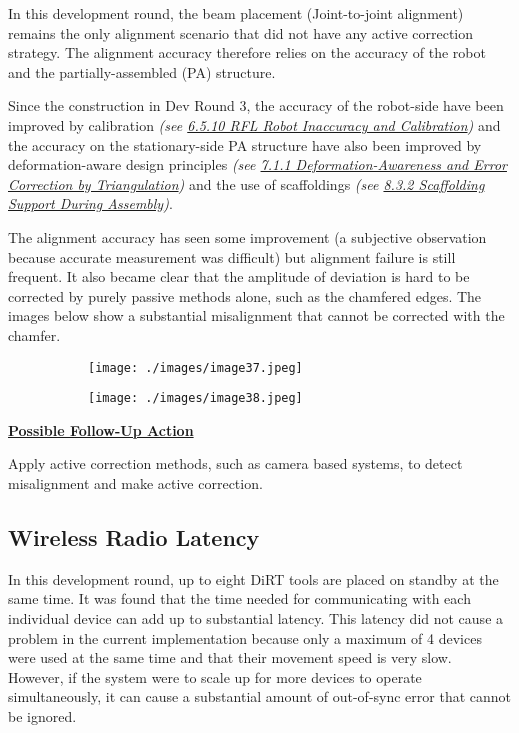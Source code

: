 In this development round, the beam placement (Joint-to-joint alignment) remains the only alignment scenario that did not have any active correction strategy. The alignment accuracy therefore relies on the accuracy of the robot and the partially-assembled (PA) structure. 

Since the construction in Dev Round 3, the accuracy of the robot-side have been improved by calibration \textit{(see \uline{6.5.10 RFL Robot Inaccuracy and Calibration})} and the accuracy on the stationary-side PA structure have also been improved by deformation-aware design principles \textit{(see \uline{7.1.1 Deformation-Awareness and Error Correction by Triangulation})} and the use of scaffoldings \textit{(see \uline{8.3.2 Scaffolding Support During Assembly})}.

The alignment accuracy has seen some improvement (a subjective observation because accurate measurement was difficult) but alignment failure is still frequent. It also became clear that the amplitude of deviation is hard to be corrected by purely passive methods alone, such as the chamfered edges. The images below show a substantial misalignment that cannot be corrected with the chamfer. 

\begin{figure}[H]
\centering
\begin{subfigure}[b]{0.45\textwidth}
\centering
\texttt{[image: ./images/image37.jpeg]}
\end{subfigure}
\hfill
\begin{subfigure}[b]{0.45\textwidth}
\centering
\texttt{[image: ./images/image38.jpeg]}
\end{subfigure}
\end{figure}


\textbf{\uline{Possible Follow-Up Action}}

Apply active correction methods, such as camera based systems, to detect misalignment and make active correction.

\subsection{Wireless Radio Latency}

In this development round, up to eight DiRT tools are placed on standby at the same time. It was found that the time needed for communicating with each individual device can add up to substantial latency. This latency did not cause a problem in the current implementation because only a maximum of 4 devices were used at the same time and that their movement speed is very slow. However, if the system were to scale up for more devices to operate simultaneously, it can cause a substantial amount of out-of-sync error that cannot be ignored.

